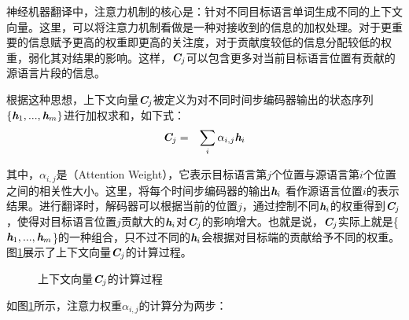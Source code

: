 \parinterval 神经机器翻译中，注意力机制的核心是：针对不同目标语言单词生成不同的上下文向量。这里，可以将注意力机制看做是一种对接收到的信息的加权处理。对于更重要的信息赋予更高的权重即更高的关注度，对于贡献度较低的信息分配较低的权重，弱化其对结果的影响。这样，$\textbf{\em C}_j$可以包含更多对当前目标语言位置有贡献的源语言片段的信息。

\parinterval 根据这种思想，上下文向量$\textbf{\em C}_j$被定义为对不同时间步编码器输出的状态序列$\{ \textbf{\em h}_1,...,\textbf{\em h}_m \}$进行加权求和，如下式：
\begin{eqnarray}
\textbf{\em C}_j&=&\sum_{i} \alpha_{i,j} \textbf{\em h}_i
\label{eq:10-16}
\end{eqnarray}

\noindent 其中，$\alpha_{i,j}$是{\small{}}（Attention Weight），它表示目标语言第$j$个位置与源语言第$i$个位置之间的相关性大小。这里，将每个时间步编码器的输出$\textbf{\em h}_i$ 看作源语言位置$i$的表示结果。进行翻译时，解码器可以根据当前的位置$j$，通过控制不同$\textbf{\em h}_i$的权重得到$\textbf{\em C}_j$，使得对目标语言位置$j$贡献大的$\textbf{\em h}_i$对$\textbf{\em C}_j$的影响增大。也就是说，$\textbf{\em C}_j$实际上就是\{${\textbf{\em h}_1,...,\textbf{\em h}_m}$\}的一种组合，只不过不同的$\textbf{\em h}_i$会根据对目标端的贡献给予不同的权重。图\ref{fig:10-19}展示了上下文向量$\textbf{\em C}_j$的计算过程。

\begin{figure}[htp]
\centering

\caption{上下文向量$\textbf{\em C}_j$的计算过程}
\label{fig:10-19}
\end{figure}

\parinterval 如图\ref{fig:10-19}所示，注意力权重$\alpha_{i,j}$的计算分为两步：

